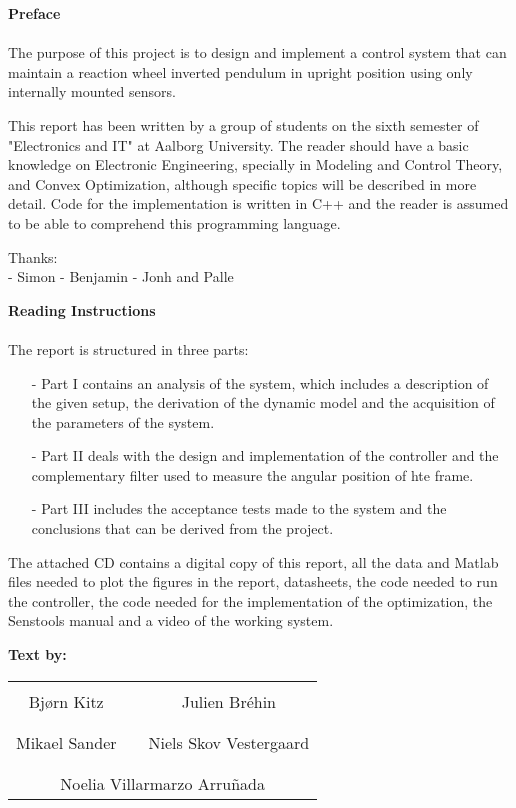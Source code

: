 \textbf{\huge{Preface}}
\\
\\
The purpose of this project is to design and implement a control system that can maintain a reaction wheel inverted pendulum in upright position using only internally mounted sensors.

This report has been written by a group of students on the sixth semester of "Electronics and IT" at Aalborg University.
The reader should have a basic knowledge on Electronic Engineering, specially in Modeling and Control Theory, and Convex Optimization, although specific topics will be described in more detail. Code for the implementation is written in C++ and the reader is assumed to be able to comprehend this programming language. 

Thanks:\\
- Simon
- Benjamin
- Jonh and Palle

\textbf{Reading Instructions}
\\
\\
The report is structured in three parts:
\begin{itemize}
\item[-] Part I contains an analysis of the system, which includes a description of the given setup, the derivation of the dynamic model and the acquisition of the parameters of the system.
\item[-] Part II deals with the design and implementation of the controller and the complementary filter used to measure the angular position of hte frame.
\item[-] Part III includes the acceptance tests made to the system and the conclusions that can be derived from the project.
\end{itemize}

The attached CD contains a digital copy of this report, all the data and Matlab files needed to plot the figures in the report, datasheets, the code needed to run the controller, the code needed for the implementation of the optimization, the Senstools manual and a video of the working system.  

\textbf{Text by:}\\
\vspace{-12 pt}
\begin{table}[H]
	\centering
		\begin{tabular}{c c c}
			\underline{\phantom{JAERJAERJAERJAERGO}} & \phantom{cookies} & \underline{\phantom{JAERJAERJAERJAERGO}} \\
			Bjørn Kitz			& \phantom{cookies} & Julien Br\'ehin		\\
			&&\\
			\underline{\phantom{JAERJAERJAERJAERGO}} & \phantom{cookies} & \underline{\phantom{JAERJAERJAERJAERGO}} \\
			Mikael Sander			& \phantom{cookies} & Niels Skov Vestergaard		\\
			&&\\
	    \multicolumn{3}{c}{\underline{\phantom{JAERJAERJAERJAERGO}}}\\
	    \multicolumn{3}{c}{Noelia Villarmarzo Arruñada}\\				
		\end{tabular}
\end{table}
\pagebreak